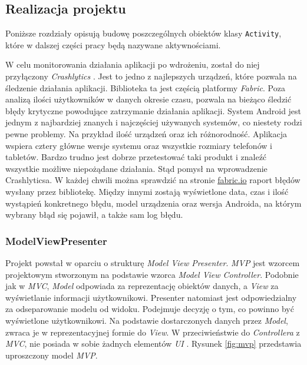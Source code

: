 \documentclass[twoside]{projektInzynierskiMS}
\begin{document}
\subsection{Realizacja projektu}

Poniższe rozdziały opisują budowę poszczególnych obiektów klasy \verb`Activity`, które w dalszej części pracy będą nazywane aktywnościami. 

W celu monitorowania działania aplikacji po wdrożeniu, został do niej przyłączony \textit{Crashlytics} \cite{crashlytics}. Jest to jedno z najlepszych urządzeń, które pozwala na śledzenie działania aplikacji. Biblioteka ta jest częścią platformy \textit{Fabric}. Poza analizą ilości użytkowników w danych okresie czasu, pozwala na bieżąco śledzić błędy krytyczne powodujące zatrzymanie działania aplikacji. System Android jest jednym z najbardziej znanych i najczęściej używanych systemów, co niestety rodzi pewne problemy. Na przykład ilość urządzeń oraz ich różnorodność. Aplikacja wspiera cztery główne wersje systemu oraz wszystkie rozmiary telefonów i tabletów. Bardzo trudno jest dobrze przetestować taki produkt i znaleźć wszystkie możliwe niepożądane działania. Stąd pomysł na wprowadzenie Crashlyticsa. W każdej chwili można sprawdzić na stronie \href{https://fabric.io/}{fabric.io} raport błędów wysłany przez bibliotekę. Między innymi zostają wyświetlone data, czas i ilość wystąpień konkretnego błędu, model urządzenia oraz wersja Androida, na którym wybrany błąd się pojawił, a także sam log błędu. 

\subsubsection{ModelViewPresenter}

Projekt powstał w oparciu o strukturę \textit{Model View Presenter}. \textit{MVP} jest wzorcem projektowym stworzonym na podstawie wzorca \textit{Model View Controller}. Podobnie jak w \textit{MVC}, \textit{Model} odpowiada za reprezentację obiektów danych, a \textit{View} za wyświetlanie informacji użytkownikowi. Presenter natomiast jest odpowiedzialny za odseparowanie modelu od widoku. Podejmuje decyzję o tym, co powinno być wyświetlone użytkownikowi. Na podstawie dostarczonych danych przez \textit{Model}, zwraca je w reprezentacyjnej formie do \textit{View}. W przeciwieństwie do \textit{Controllera} z \textit{MVC}, nie posiada w sobie żadnych elementów \textit{UI} \cite{mvpBook}. Rysunek \ref{fig:mvp} przedstawia uproszczony model \textit{MVP}.
\end{document}
